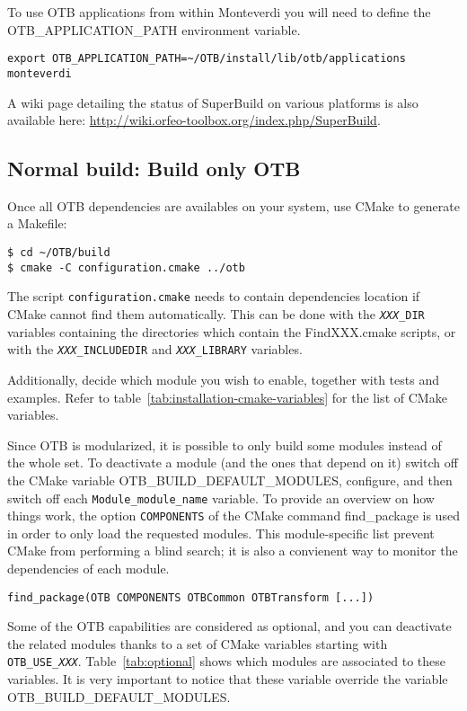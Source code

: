 To use OTB applications from within Monteverdi you will need to define the
OTB\_APPLICATION\_PATH environment variable.
\begin{verbatim}
export OTB_APPLICATION_PATH=~/OTB/install/lib/otb/applications
monteverdi
\end{verbatim}

A wiki page detailing the status of SuperBuild on various platforms is also available here:
\url{http://wiki.orfeo-toolbox.org/index.php/SuperBuild}.

\subsection{Normal build: Build only OTB}
\label{sec:installation-linux-normalbuild}

Once all OTB dependencies are availables on your system, use CMake to generate a Makefile:
\begin{verbatim}
$ cd ~/OTB/build
$ cmake -C configuration.cmake ../otb
\end{verbatim}
The script \texttt{configuration.cmake} needs to contain dependencies location
if CMake cannot find them automatically.  This can be done with
the \texttt{\textit{XXX}\_DIR} variables containing the directories which
contain the FindXXX.cmake scripts, or with the \texttt{\textit{XXX}\_INCLUDEDIR}
and \texttt{\textit{XXX}\_LIBRARY} variables.

Additionally, decide which module you wish to enable, together with tests and
examples.  Refer to table~\ref{tab:installation-cmake-variables} for the list of
CMake variables.

Since OTB is modularized, it is possible to only build some modules instead of
the whole set.  To deactivate a module (and the ones that depend on it) switch
off the CMake variable OTB\_BUILD\_DEFAULT\_MODULES, configure, and then switch
off each \texttt{Module\_module\_name} variable.  To provide an overview on how
things work, the option \texttt{COMPONENTS} of the CMake command find\_package
is used in order to only load the requested modules.  This module-specific list
prevent CMake from performing a blind search; it is also a convienent way to
monitor the dependencies of each module.
\begin{verbatim}
find_package(OTB COMPONENTS OTBCommon OTBTransform [...])
\end{verbatim} 

Some of the OTB capabilities are considered as optional, and you can deactivate
the related modules thanks to a set of CMake variables starting
with \texttt{OTB\_USE\_\textit{XXX}}.  Table~\ref{tab:optional} shows which
modules are associated to these variables. It is very important to notice that
these variable override the variable OTB\_BUILD\_DEFAULT\_MODULES.

